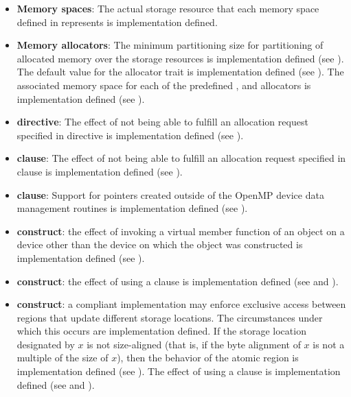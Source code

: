 \begin{itemize}
\item \textbf{Memory spaces}: The actual storage resource that each memory space defined in  represents is implementation defined.

\item \textbf{Memory allocators}: The minimum partitioning size for partitioning of allocated memory over the storage resources is implementation defined (see ).
The default value for the  allocator trait is implementation defined (see ).
The associated memory space for each of the predefined ,  and  allocators is implementation defined (see  ).

\item {} \textbf{directive}: The effect of not being able to fulfill an allocation request specified in  directive is implementation defined (see ).

\item {} \textbf{clause}: The effect of not being able to fulfill an allocation request specified in  clause is implementation defined (see ).

\item {} \textbf{clause}:
  Support for pointers created outside of the OpenMP device data management
  routines is implementation defined (see ).

\item {} \textbf{construct}: the effect of invoking a virtual member
function of an object on a device other than the device on which the object was
constructed is implementation defined (see ).

\item {} \textbf{construct}: the effect of using a 
clause is implementation defined (see  and ).

\item {} \textbf{construct}: a compliant implementation may enforce exclusive access
between  regions that update different storage locations. The circumstances
under which this occurs are implementation defined. If the storage location
designated by $x$ is not size-aligned (that is, if the byte alignment of $x$ is not a multiple
of the size of $x$), then the behavior of the atomic region is implementation defined (see ).
The effect of using a  clause is implementation defined (see  and ).


\end{itemize}
